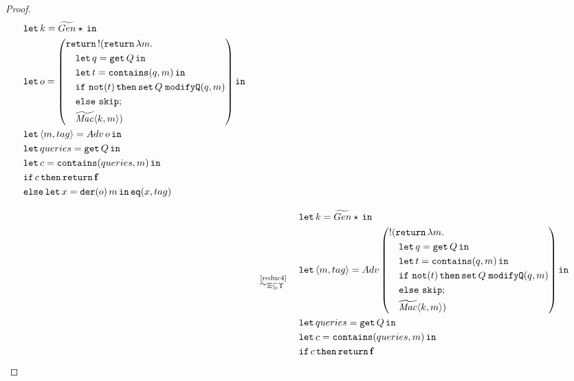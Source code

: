 \begin{proof}
{\begin{align*}
\begin{aligned}
        &\letin{k = \widetilde{Gen} \star}{} \\
        &\mathtt{let}\, o = \left(
        \begin{aligned}
            &\return \bang(\return \lambda m. \\
            &\quad \letin{q=\get Q}{} \\
            &\quad \letin{t=\mathtt{contains}(q,m)}{} \\
            &\quad \mathtt{if}\ \mathtt{not}(t)\,\mathtt{then} \,\mathtt{set}\,Q\;\mathtt{modifyQ}(q,m) \\
            &\quad \mathtt{else}\ \mathtt{skip}; \\
            &\quad \mathit{\widetilde{Mac}}\lis{k,m})
        \end{aligned}
        \right)\mathtt{in}\\
        &\letin{\lis{m,tag} = Adv\, o}{} \\
        &\letin{queries = \get Q}{} \\
        &\letin{c=\mathtt{contains}(queries, m)}{} \\
        &\mathtt{if}\, c\, \mathtt{then}\, \return \false \\
        &\mathtt{else}\,\letin{x=\mathtt{der}(o)\, m}{\mathtt{eq}(x,tag)}
    \end{aligned}
    \\[2ex]
    &\quad\overset{\text{~\ref{reduc4}}}{\simcontext}\quad
    \begin{aligned}
        &\letin{k = \widetilde{Gen} \star}{} \\
        &\mathtt{let}\, \lis{m,tag} = Adv \left(
        \begin{aligned}
            &\bang(\return \lambda m. \\
            &\quad \letin{q=\get Q}{} \\
            &\quad \letin{t=\mathtt{contains}(q,m)}{} \\
            &\quad \mathtt{if}\ \mathtt{not}(t)\,\mathtt{then} \,\mathtt{set}\,Q\;\mathtt{modifyQ}(q,m) \\
            &\quad \mathtt{else}\ \mathtt{skip}; \\
            &\quad \mathit{\widetilde{Mac}}\lis{k,m})
        \end{aligned}
        \right)\mathtt{in} \\
        &\letin{queries = \get Q}{} \\
        &\letin{c=\mathtt{contains}(queries, m)}{} \\
        &\mathtt{if}\,c\, \mathtt{then}\, \return \false \\

\end{aligned}
\end{align*}}
\end{proof}
